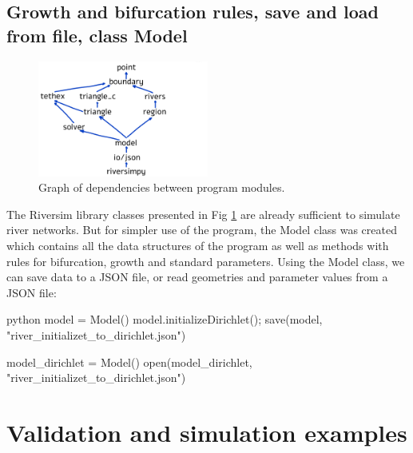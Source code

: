 \documentclass[]{pracamgr}
\begin{document}
    \section{Growth and bifurcation rules, save and load from file, class Model}
      \begin{figure}[H]
        \centering
        \includegraphics[width=0.5\textwidth]{figs/program_dependecy_graph.png}        
        \caption{Graph of dependencies between program modules.}
        \label{program_strucutre}
      \end{figure}

    The Riversim library classes presented in Fig \ref{program_strucutre} are already sufficient to simulate river networks. But for simpler use of the program, the Model class was created which contains all the data structures of the program as well as methods with rules for bifurcation, growth and standard parameters. Using the Model class, we can save data to a JSON file, or read geometries and parameter values from a JSON file:

    \begin{mintedbox}{python}
      model = Model()
      model.initializeDirichlet();
      save(model, "river_initializet_to_dirichlet.json")
      
      model_dirichlet = Model()
      open(model_dirichlet, "river_initializet_to_dirichlet.json")\end{mintedbox}


  \chapter{Validation and simulation examples}
\end{document}
